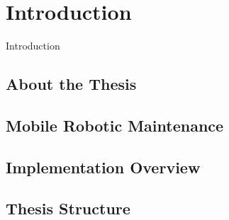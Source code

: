 \chapter{Introduction}
\label{chp:introduction} 

Introduction
\section{About the Thesis}

\section{Mobile Robotic Maintenance}

\section{Implementation Overview}

\section{Thesis Structure}